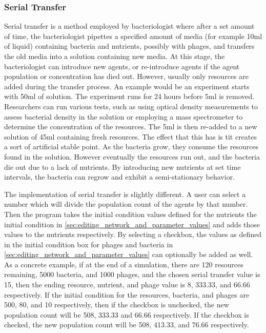 \subsubsection{Serial Transfer}
Serial transfer is a method employed by bacteriologist where after a set amount of time, the bacteriologist pipettes a specified amount of media (for example 10ml of liquid) containing bacteria and  nutrients, possibly with phages, and transfers the old media into a solution containing new media. 
At this stage, the bacteriologist can introduce new agents, or re-introduce agents if the agent population or concentration has died out. 
However, usually only resources are added during the transfer process. 
An example would be an experiment starts with 50ml of solution. 
The experiment runs for 24 hours before 5ml is removed. 
Researchers can run various tests, such as using optical density measurements to assess bacterial density in the solution or employing a mass spectrometer to determine the concentration of the resources. 
The 5ml is then re-added to a new solution of 45ml containing fresh resources. 
The effect that this has is tit creates a sort of artificial stable point. 
As the bacteria grow, they consume the resources found in the solution. 
However eventually the resources run out, and the bacteria die out due to a lack of nutrients. 
By introducing new nutrients at set time intervals, the bacteria can regrow and exhibit a semi-stationary behavior. 
\newline 

The implementation of serial transfer is slightly different. 
A user can select a number which will divide the population count of the agents by that number. 
Then the program takes the initial condition values defined for the nutrients the initial condition in \ref{sec:editing_network_and_parameter_values} and adds those values to the nutrients respectively. 
By selecting a checkbox, the values as defined in the initial condition box for phages and bacteria in \ref{sec:editing_network_and_parameter_values} can optionally be added as well. 
As a concrete example, if at the end of a simulation, there are 120 resources remaining, 5000 bacteria, and 1000 phages, and the chosen serial transfer value is 15, then the ending resource, nutrient, and phage value is 8, 333.33, and 66.66 respectively. 
If the initial condition for the resources, bacteria, and phages are 500, 80, and 10 respectively, then if the checkbox is unchecked, the new population count will be 508, 333.33 and 66.66 respectively. 
If the checkbox is checked, the new population count will be 508, 413.33, and 76.66 respectively. 

